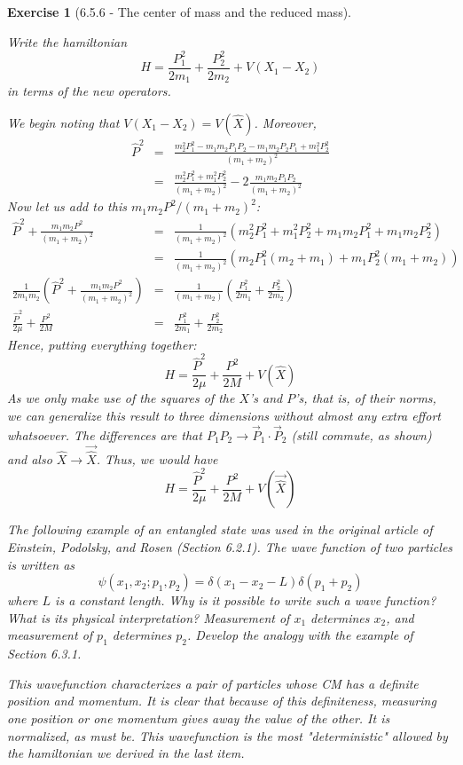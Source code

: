 \documentclass[12pt]{article}
\def\be{\begin{equation}}
\def\ee{\end{equation}}
\def\bea{\begin{eqnarray*}}
\def\eea{\end{eqnarray*}}
\def\f{\frac}
\def\l{\left}
\def\r{\right}
\newtheorem{exercise}{Exercise}
\begin{document}
\begin{exercise}[6.5.6 -  The center of mass and the reduced mass]
\begin{exercises}
			\item Write the hamiltonian
			\be
				H = \f{P_1^2}{2m_1} + \f{P_2^2}{2m_2} + V(X_1-X_2)
			\ee
			in terms of the new operators.
			\begin{multianswer}
				We begin noting that $V(X_1-X_2) = V(\hat{X})$. Moreover,
				\bea
					\hat{P}^2 &=& \f{m_2^2P_1^2 - m_1m_2P_1P_2 - m_1m_2 P_2P_1 + m_1^2P_2^2}{(m_1+m_2)^2} \\
						&=& \f{m_2^2P_1^2 + m_1^2P_2^2}{(m_1+m_2)^2} - 2 \f{m_1m_2 P_1P_2}{(m_1+m_2)^2}
				\eea
				Now let us add to this $m_1m_2P^2/(m_1+m_2)^2$:
				\bea
					\hat{P}^2 +\f{m_1m_2P^2}{(m_1+m_2)^2} &=& \f{1}{(m_1+m_2)^2} \l( m_2^2P_1^2 + m_1^2P_2^2 + m_1m_2P_1^2 + m_1m_2P_2^2 \r) \\
						&=& \f{1}{(m_1+m_2)^2} \l( m_2P_1^2(m_2 + m_1) + m_1P_2^2(m_1+m_2) \r) \\
					\f{1}{2m_1m_2} \l(\hat{P}^2 +\f{m_1m_2P^2}{(m_1+m_2)^2}\r) &=& 
							 \f{1}{(m_1+m_2)} \l( \f{P_1^2}{2m_1} +  \f{P_2^2}{2m_2} \r) \\ 
					\f{\hat{P}^2}{2\mu} + \f{P^2}{2M} &=& \f{P_1^2}{2m_1} +  \f{P_2^2}{2m_2}
				\eea
				Hence, putting everything together:
				\be
					H = \f{\hat{P}^2}{2\mu} + \f{P^2}{2M} + V(\hat{X})
				\ee
				As we only make use of the squares of the $X$'s and $P$'s, that is, of their norms, we can generalize this result to three dimensions without almost any extra effort whatsoever. The differences are that $P_1P_2\to \vec{P}_1\cdot\vec{P}_2$ (still commute, as shown) and also $\hat{X} \to \vec{\hat{X}}$. Thus, we would have
				\be
					H = \f{\hat{P}^2}{2\mu} + \f{P^2}{2M} + V(\vec{\hat{X}})
				\ee
			\end{multianswer}
			
			\item The following example of an entangled state was used in the original article of Einstein, Podolsky,
			and Rosen (Section 6.2.1). The wave function of two particles is written as
			\be
				\psi(x_1, x_2; p_1, p_2) = \delta(x_1 - x_2 - L) \delta( p_1 + p_2 )
			\ee
			where $L$ is a constant length. Why is it possible to write such a wave function? What is its physical interpretation? Measurement of $x_1$ determines $x_2$, and measurement of $p_1$ determines $p_2$. Develop the analogy with the example of Section 6.3.1.
			\begin{multianswer}[true]
				This wavefunction characterizes a pair of particles whose CM has a definite position and momentum. It is clear that because of this definiteness, measuring one position or one momentum gives away the value of the other. It is normalized, as must be. This wavefunction is the most "deterministic" allowed by the hamiltonian we derived in the last item. 
			\end{multianswer}
		\end{exercises}
	\end{exercise}
	
\end{document}
